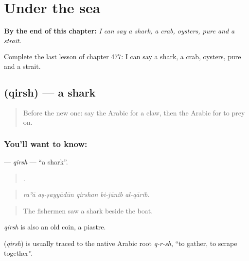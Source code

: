
\chapter{Under the sea}
\label{ch:ar-under-the-sea}

\begin{chapteropening}
\textbf{By the end of this chapter:} \emph{I can say a shark, a crab, oysters, pure and a strait.}

Complete the last lesson of chapter 477: I can say a shark, a crab, oysters, pure and a strait.
\end{chapteropening}

\section[\texorpdfstring{\ar{قرش} (qirsh)}{قرش (qirsh)}]{ (qirsh) — a shark}

\label{lesson:AR-C477-qirsh}



\begin{quote}
Before the new one: say the Arabic for a claw, then the Arabic for to prey on.
\end{quote}

\subsection*{You'll want to know: }
\textbf{} — \emph{qirsh} — \textquotedblleft{}a shark\textquotedblright{}.

\begin{quote}
    .
\end{quote}

\begin{quote}
\emph{raʾā aṣ-ṣayyādūn qirshan bi-jānib al-qārib.}
\end{quote}

\begin{quote}
The fishermen saw a shark beside the boat.
\end{quote}

\emph{qirsh} is also an old coin, a piastre.

\begin{cousinweb}
\textbf{} (\emph{qirsh}) is usually traced to the native Arabic root \emph{q-r-sh}, \textquotedblleft{}to gather, to scrape together\textquotedblright{}.
\end{cousinweb}

